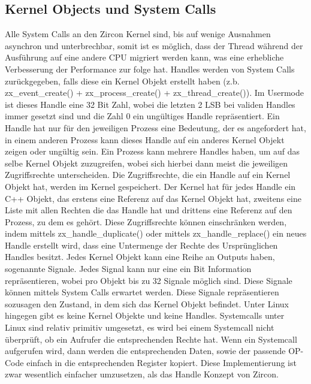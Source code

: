\documentclass[a4paper]{scrartcl}
\begin{document}
\subsection{Kernel Objects und System Calls}
Alle System Calls an den Zircon Kernel sind, bis auf wenige Ausnahmen asynchron und unterbrechbar, somit ist es möglich, dass der Thread während der Ausführung auf eine andere CPU migriert werden kann, was eine erhebliche Verbesserung der Performance zur folge hat.
Handles werden von System Calls zurückgegeben, falls diese ein Kernel Objekt erstellt haben (z.b. zx\_event\_create() + zx\_process\_create() + zx\_thread\_create()). Im Usermode ist dieses Handle eine 32 Bit Zahl, wobei die letzten 2 LSB bei validen Handles immer gesetzt sind und die Zahl 0 ein ungültiges Handle repräsentiert. Ein Handle hat nur für den jeweiligen Prozess eine Bedeutung, der es angefordert hat, in einem anderen Prozess kann dieses Handle auf ein anderes Kernel Objekt zeigen oder ungültig sein. Ein Prozess kann mehrere Handles haben, um auf das selbe Kernel Objekt zuzugreifen, wobei sich hierbei dann meist die jeweiligen Zugriffsrechte unterscheiden. Die Zugriffsrechte, die ein Handle auf ein Kernel Objekt hat, werden im Kernel gespeichert. Der Kernel hat für jedes Handle ein C++ Objekt, das erstens eine Referenz auf das Kernel Objekt hat, zweitens eine Liste mit allen Rechten die das Handle hat und drittens eine Referenz auf den Prozess, zu dem es gehört. Diese Zugriffsrechte können einschränken werden, indem mittels zx\_handle\_duplicate() \cite{https://fuchsia.dev/fuchsia-src/reference/syscalls/handle_replace} oder mittels zx\_handle\_replace() \cite{https://fuchsia.dev/fuchsia-src/reference/syscalls/handle_replace} ein neues Handle erstellt wird, dass eine Untermenge der Rechte des Ursprünglichen Handles besitzt.
Jedes Kernel Objekt kann eine Reihe an Outputs haben, sogenannte Signale. Jedes Signal kann nur eine ein Bit Information repräsentieren, wobei pro Objekt bis zu 32 Signale möglich sind. Diese Signale können mittels System Calls erwartet werden. Diese Signale repräsentieren sozusagen den Zustand, in dem sich das Kernel Objekt befindet.
Unter Linux hingegen gibt es keine Kernel Objekte und keine Handles. Systemcalls unter Linux sind relativ primitiv umgesetzt, es wird bei einem Systemcall nicht überprüft, ob ein Aufrufer die entsprechenden Rechte hat. Wenn ein Systemcall aufgerufen wird, dann werden die entsprechenden Daten, sowie der passende OP-Code einfach in die entsprechenden Register kopiert. Diese Implementierung ist zwar wesentlich einfacher umzusetzen, als das Handle Konzept von Zircon.
\end{document}
